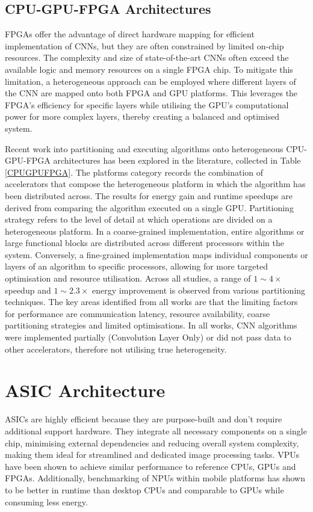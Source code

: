 \subsection{CPU-GPU-FPGA Architectures}

FPGAs offer the advantage of direct hardware mapping for efficient implementation of CNNs\cite{NguNguKim19}, but they are often constrained by limited on-chip resources\cite{ShawSai19}. The complexity and size of state-of-the-art CNNs often exceed the available logic and memory resources on a single FPGA chip. To mitigate this limitation, a heterogeneous approach can be employed where different layers of the CNN are mapped onto both FPGA and GPU platforms. This leverages the FPGA's efficiency for specific layers while utilising the GPU's computational power for more complex layers, thereby creating a balanced and optimised system.

Recent work into partitioning and executing algorithms onto heterogeneous CPU-GPU-FPGA architectures has been explored in the literature, collected in Table \ref{CPUGPUFPGA}. The platforms category records the combination of accelerators that compose the heterogeneous platform in which the algorithm has been distributed across. The results for energy gain and runtime speedups are derived from comparing the algorithm executed on a single GPU. Partitioning strategy refers to the level of detail at which operations are divided on a heterogeneous platform. In a coarse-grained implementation, entire algorithms or large functional blocks are distributed across different processors within the system. Conversely, a fine-grained implementation maps individual components or layers of an algorithm to specific processors, allowing for more targeted optimisation and resource utilisation.  Across all studies, a range of $1\sim4\times$ speedup and $1\sim2.3\times$ energy improvement is observed from various partitioning techniques. The key areas identified from all works are that the limiting factors for performance are communication latency, resource availability, coarse partitioning strategies and limited optimisations. In all works, CNN algorithms were implemented partially (\eg Convolution Layer Only) or did not pass data to other accelerators, therefore not utilising true heterogeneity.

\section{ASIC Architecture}
ASICs are highly efficient because they are purpose-built and don't require additional support hardware. They integrate all necessary components on a single chip, minimising external dependencies and reducing overall system complexity, making them ideal for streamlined and dedicated image processing tasks\cite{RivPenMolo18, kyrPapEli19}. VPUs have been shown to achieve similar performance to reference CPUs, GPUs and FPGAs. Additionally, benchmarking of NPUs within mobile platforms has shown to be better in runtime than desktop CPUs and comparable to GPUs while consuming less energy\cite{IgnTimKul19}. 



